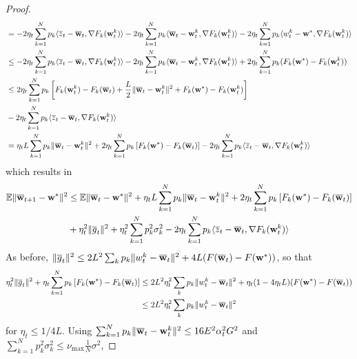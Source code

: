 \begin{proof}
\begin{align*}
	& =-2\eta_{t}\sum_{k=1}^{N}p_{k}\langle\overline{z}_{t}-{\overline{\mathbf{w}}}_{t},\nabla F_{k}({\mathbf{w}}_{t}^{k})\rangle-2\eta_{t}\sum_{k=1}^{N}p_{k}\langle{\overline{\mathbf{w}}}_{t}-{\mathbf{w}}_{t}^{k},\nabla F_{k}({\mathbf{w}}_{t}^{k})\rangle-2\eta_{t}\sum_{k=1}^{N}p_{k}\langle w_{t}^{k}-{\mathbf{w}}^{\ast},\nabla F_{k}({\mathbf{w}}_{t}^{k})\rangle\\
	& \leq-2\eta_{t}\sum_{k=1}^{N}p_{k}\langle\overline{z}_{t}-{\overline{\mathbf{w}}}_{t},\nabla F_{k}({\mathbf{w}}_{t}^{k})\rangle-2\eta_{t}\sum_{k=1}^{N}p_{k}\langle{\overline{\mathbf{w}}}_{t}-{\mathbf{w}}_{t}^{k},\nabla F_{k}({\mathbf{w}}_{t}^{k})\rangle+2\eta_{t}\sum_{k=1}^{N}p_{k}(F_{k}({\mathbf{w}}^{\ast})-F_{k}({\mathbf{w}}_{t}^{k}))\\
	& \leq2\eta_{t}\sum_{k=1}^{N}p_{k}\left[F_{k}({\mathbf{w}}_{t}^{k})-F_{k}({\overline{\mathbf{w}}}_{t})+\frac{L}{2}\|{\overline{\mathbf{w}}}_{t}-{\mathbf{w}}_{t}^{k}\|^{2}+F_{k}({\mathbf{w}}^{\ast})-F_{k}({\mathbf{w}}_{t}^{k})\right]\\
	& -2\eta_{t}\sum_{k=1}^{N}p_{k}\langle\overline{z}_{t}-{\overline{\mathbf{w}}}_{t},\nabla F_{k}({\mathbf{w}}_{t}^{k})\rangle\\
	& =\eta_{t}L\sum_{k=1}^{N}p_{k}\|{\overline{\mathbf{w}}}_{t}-{\mathbf{w}}_{t}^{k}\|^{2}+2\eta_{t}\sum_{k=1}^{N}p_{k}\left[F_{k}({\mathbf{w}}^{\ast})-F_{k}({\overline{\mathbf{w}}}_{t})\right]-2\eta_{t}\sum_{k=1}^{N}p_{k}\langle\overline{z}_{t}-{\overline{\mathbf{w}}}_{t},\nabla F_{k}({\mathbf{w}}_{t}^{k})\rangle
	\end{align*}
	which results in 
	\begin{align*}
	\mathbb{E}\|{\overline{\mathbf{w}}}_{t+1}-{\mathbf{w}}^{\ast}\|^{2} & \leq\mathbb{E}\|{\overline{\mathbf{w}}}_{t}-{\mathbf{w}}^{\ast}\|^{2}+\eta_{t}L\sum_{k=1}^{N}p_{k}\|{\overline{\mathbf{w}}}_{t}-{\mathbf{w}}_{t}^{k}\|^{2}+2\eta_{t}\sum_{k=1}^{N}p_{k}\left[F_{k}({\mathbf{w}}^{\ast})-F_{k}({\overline{\mathbf{w}}}_{t})\right]\\
	& +\eta_{t}^{2}\|\overline{g}_{t}\|^{2}+\eta_{t}^{2}\sum_{k=1}^{N}p_{k}^{2}\sigma_{k}^{2}-2\eta_{t}\sum_{k=1}^{N}p_{k}\langle\overline{z}_{t}-{\overline{\mathbf{w}}}_{t},\nabla F_{k}({\mathbf{w}}_{t}^{k})\rangle
	\end{align*}
	As before, $\|\overline{g}_{t}\|^{2}\leq2L^{2}\sum_{k}p_{k}\|w_{t}^{k}-{\overline{\mathbf{w}}}_{t}\|^{2}+4L(F({\overline{\mathbf{w}}}_{t})-F({\mathbf{w}}^{\ast}))$,
	so that 
	\begin{align*}
	\eta_{t}^{2}\|\overline{g}_{t}\|^{2}+\eta_{t}\sum_{k=1}^{N}p_{k}\left[F_{k}({\mathbf{w}}^{\ast})-F_{k}({\overline{\mathbf{w}}}_{t})\right] & \leq2L^{2}\eta_{t}^{2}\sum_{k}p_{k}\|w_{t}^{k}-{\overline{\mathbf{w}}}_{t}\|^{2}+\eta_{t}(1-4\eta_{t}L)(F({\mathbf{w}}^{\ast})-F({\overline{\mathbf{w}}}_{t}))\\
	& \leq2L^{2}\eta_{t}^{2}\sum_{k}p_{k}\|w_{t}^{k}-{\overline{\mathbf{w}}}_{t}\|^{2}
	\end{align*}
	for $\eta_{t}\le1/4L$. Using $\sum_{k=1}^{N}p_{k}\|{\overline{\mathbf{w}}}_{t}-{\mathbf{w}}_{t}^{k}\|^{2}\leq16E^{2}\alpha_{t}^{2}G^{2}$
	and $\sum_{k=1}^{N}p_{k}^{2}\sigma_{k}^{2}\leq\nu_{\max}\frac{1}{N}\sigma^{2}$,

\end{proof}
